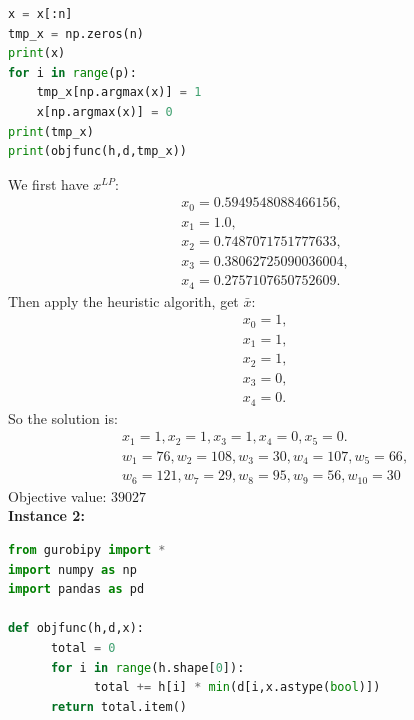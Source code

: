 \documentclass[12pt]{article}
\begin{document}
\begin{enumerate}
\begin{enumerate}
\begin{lstlisting}[language=Python]
x = x[:n]
tmp_x = np.zeros(n)
print(x)
for i in range(p):
    tmp_x[np.argmax(x)] = 1
    x[np.argmax(x)] = 0
print(tmp_x)
print(objfunc(h,d,tmp_x))
                        \end{lstlisting}
                        We first have $x^{LP}$:
                        \begin{align*}
                               & x_{0} = 0.5949548088466156,  \\
                               & x_{1} = 1.0,                 \\
                               & x_{2} = 0.7487071751777633,  \\
                               & x_{3} = 0.38062725090036004, \\
                               & x_{4} = 0.2757107650752609.
                        \end{align*}
                        Then apply the heuristic algorith, get
                        $\bar{x}$:
                        \begin{align*}
                               & x_{0} = 1, \\
                               & x_{1} = 1, \\
                               & x_{2} = 1, \\
                               & x_{3} = 0, \\
                               & x_{4} = 0.
                        \end{align*}
                        So the solution is:
                        \begin{align*}
                               & x_1 = 1, x_2 = 1, x_3 = 1, x_4 = 0, x_5 = 0.         \\
                               & w_1 = 76, w_2 = 108, w_3 = 30, w_4 = 107, w_5 = 66,  \\
                               & w_6 = 121, w_7 = 29, w_8 = 95, w_9 = 56, w_{10} = 30
                        \end{align*}
                        Objective value:  $39027$\\
                        \textbf{Instance 2:}
                        \begin{lstlisting}[language=Python]
from gurobipy import *
import numpy as np
import pandas as pd

def objfunc(h,d,x):
      total = 0
      for i in range(h.shape[0]):
            total += h[i] * min(d[i,x.astype(bool)])
      return total.item()



\end{lstlisting}
\end{enumerate}
\end{enumerate}
\end{document}
